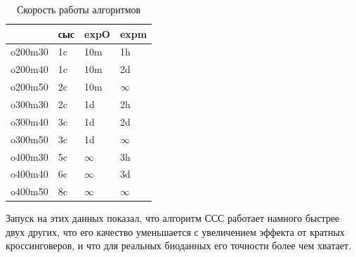 \documentclass{matmex-diploma-custom}
\begin{document}

\begin{table}[h]
  \centering
  \begin{tabular}{llll}
    \hline
    & сыс & expO & expm \\
    \hline
    o200m30 & 1c & 10m & 1h \\
    o200m40 & 1c & 10m & 2d \\
    o200m50 & 2c & 10m & $\infty$ \\
    o300m30 & 2c & 1d & 2h \\
    o300m40 & 3c & 1d & 2d \\
    o300m50 & 3c & 1d & $\infty$ \\
    o400m30 & 5c & $\infty$ & 3h \\
    o400m40 & 6c & $\infty$ & 3d \\
    o400m50 & 8c & $\infty$ & $\infty$ \\
    \hline
  \end{tabular}

  \caption{Скорость работы алгоритмов}
  \label{tab:qual}
\end{table}

Запуск на этих данных показал, что алгоритм ССС работает намного
быстрее двух других, что его качество уменьшается с увеличением
эффекта от кратных кроссинговеров, и что для реальных биоданных его
точности более чем хватает.

\end{document}
